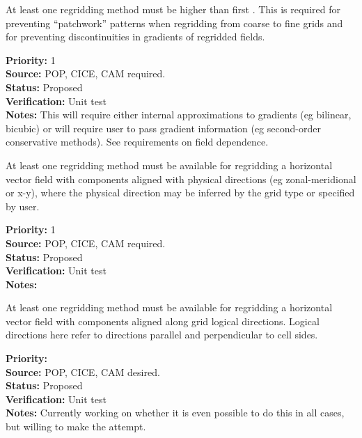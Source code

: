 At least one regridding method must be higher than first
.  This is required for preventing
``patchwork'' patterns when regridding from coarse to fine
grids and for preventing discontinuities in gradients of
regridded fields.

\begin{reqlist}
{\bf Priority:} 1 \\
{\bf Source:}  POP, CICE, CAM required. \\
{\bf Status:} Proposed \\
{\bf Verification:} Unit test \\
{\bf Notes:} This will require either internal approximations to
             gradients (eg bilinear, bicubic) or will require user
             to pass gradient information (eg second-order conservative 
             methods).  See requirements on field dependence.
\end{reqlist}


At least one regridding method must be available for regridding a horizontal
vector field with components aligned with physical directions 
(eg zonal-meridional or x-y), where the physical direction may be
inferred by the grid type or specified by user.

\begin{reqlist}
{\bf Priority:} 1 \\
{\bf Source:}  POP, CICE, CAM required. \\
{\bf Status:} Proposed \\
{\bf Verification:} Unit test \\
{\bf Notes:} 
\end{reqlist}


At least one regridding method must be available for regridding a horizontal
vector field with components aligned along grid logical directions.
Logical directions here refer to directions parallel and perpendicular
to cell sides.

\begin{reqlist}
{\bf Priority:}  \\
{\bf Source:}  POP, CICE, CAM desired. \\
{\bf Status:} Proposed \\
{\bf Verification:} Unit test \\
{\bf Notes:} Currently working on whether it is even possible to do this
             in all cases, but willing to make the attempt.
\end{reqlist}

